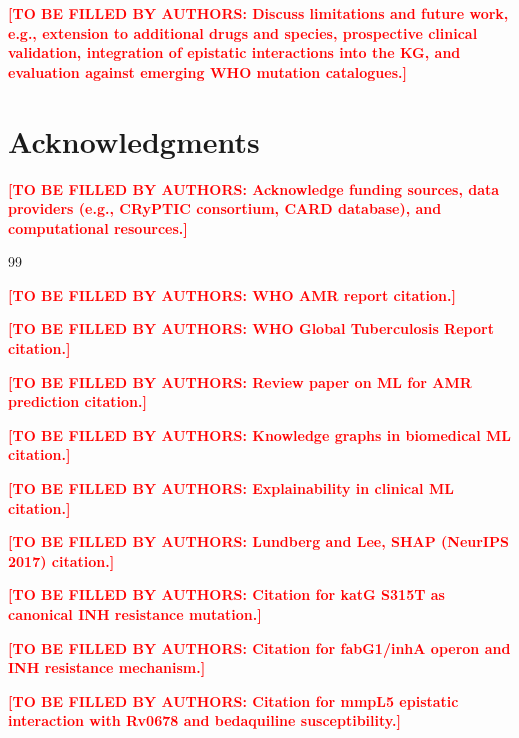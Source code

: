 \documentclass[conference]{IEEEtran}
\newcommand{\tbd}[1]{\textcolor{red}{\textbf{[TO BE FILLED BY AUTHORS: #1]}}}
\begin{document}
\tbd{Discuss limitations and future work, e.g., extension to additional drugs and species, prospective clinical validation, integration of epistatic interactions into the KG, and evaluation against emerging WHO mutation catalogues.}

\section*{Acknowledgments}
\tbd{Acknowledge funding sources, data providers (e.g., CRyPTIC consortium, CARD database), and computational resources.}

\begin{thebibliography}{99}

\tbd{WHO AMR report citation.}

\tbd{WHO Global Tuberculosis Report citation.}

\tbd{Review paper on ML for AMR prediction citation.}

\tbd{Knowledge graphs in biomedical ML citation.}

\tbd{Explainability in clinical ML citation.}

\tbd{Lundberg and Lee, SHAP (NeurIPS 2017) citation.}

\tbd{Citation for katG S315T as canonical INH resistance mutation.}

\tbd{Citation for fabG1/inhA operon and INH resistance mechanism.}

\tbd{Citation for mmpL5 epistatic interaction with Rv0678 and bedaquiline susceptibility.}

\end{thebibliography}
\end{document}
